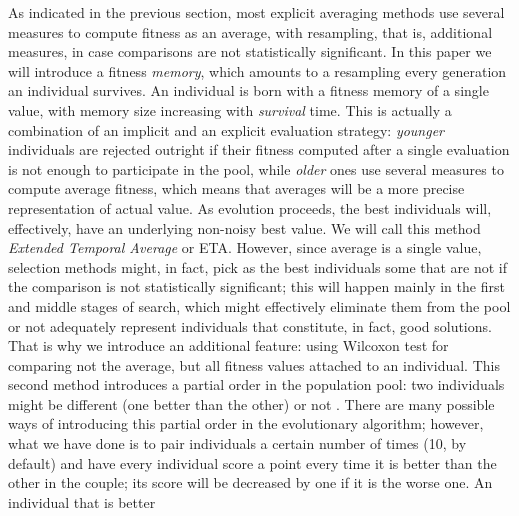 \documentclass{svmult}
\begin{document}
As indicated in the previous section, 
most explicit averaging methods
use several measures to compute fitness as an average, with
resampling, that is, additional measures, in case 
comparisons are not
statistically significant. In this paper we will introduce a fitness
{\em memory}, which amounts 
to a resampling every generation an
individual survives. An individual is born with a fitness
memory of a single value, with memory size increasing with {\em
  survival} time. This is actually a combination of an implicit and an 
explicit evaluation strategy: {\em younger} individuals are rejected
outright if their fitness computed after a single evaluation is not
enough to participate in the pool, while  {\em older} ones use several
measures to compute average fitness, which means that averages will be
a more precise representation of actual value. 
As evolution proceeds,
the best individuals will, effectively, have an underlying non-noisy
best value. We will call this method {\em Extended Temporal Average}
or {\sf ETA}. 
However, since average is a single value, selection methods might, in
fact, pick as the best individuals some that are not if the comparison
is not statistically significant; this will happen mainly in the first
and middle stages of search, which might effectively eliminate them from
the pool 
or not adequately represent individuals that constitute, in
fact, good solutions. That is why we introduce an additional feature:
using Wilcoxon test \cite{wilcoxon:1945}
for comparing not the average, but all
fitness values attached to an individual. This second method
introduces a partial order in the population pool: two individuals
might be different (one better than the other) or not \cite{wilcoxon:ga}. There are many
possible ways of introducing this partial order in the evolutionary
algorithm; however, what we have done is to pair individuals a certain
number of times (10, by default) and have every individual score a
point every time it is better than the other in the couple; its score
will be decreased by one if it is the worse one. An individual that is better
\end{document}
